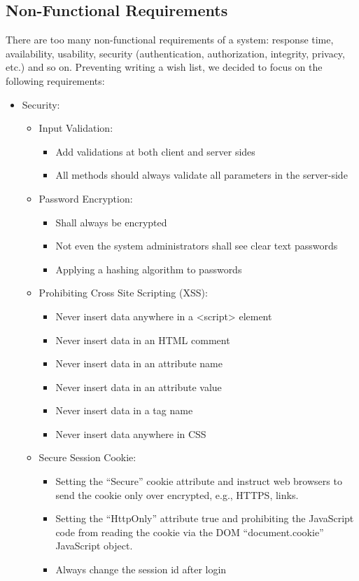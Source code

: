 \subsection{Non-Functional Requirements}
There are too many non-functional requirements of a system: response time, availability, usability, security (authentication, authorization, integrity, privacy, etc.) and so on. Preventing writing a wish list, we decided to focus on the following requirements:
\begin{itemize}
  \item Security:

  \begin{itemize}
    \item Input Validation:
    \begin{itemize}
      \item Add validations at both client and server sides
      \item All methods should always validate all parameters in the server-side
    \end{itemize}
    \item Password Encryption:
    \begin{itemize}
      \item Shall always be encrypted
      \item Not even the system administrators shall see clear text passwords
      \item Applying a hashing algorithm to passwords
    \end{itemize}
    \item Prohibiting Cross Site Scripting (XSS):
    \begin{itemize}
      \item Never insert data anywhere in a <script> element
      \item Never insert data in an HTML comment
      \item Never insert data in an attribute name
      \item Never insert data in an attribute value
      \item Never insert data in a tag name
      \item Never insert data anywhere in CSS
    \end{itemize}
    \item Secure Session Cookie:
    \begin{itemize}
      \item Setting the ``Secure'' cookie attribute and instruct web browsers to send the cookie only over encrypted, e.g., HTTPS, links.
      \item Setting the ``HttpOnly'' attribute true and prohibiting the JavaScript code from reading the cookie via the DOM ``document.cookie'' JavaScript object.
      \item Always change the session id after login
    \end{itemize}
  \end{itemize}


\end{itemize}
